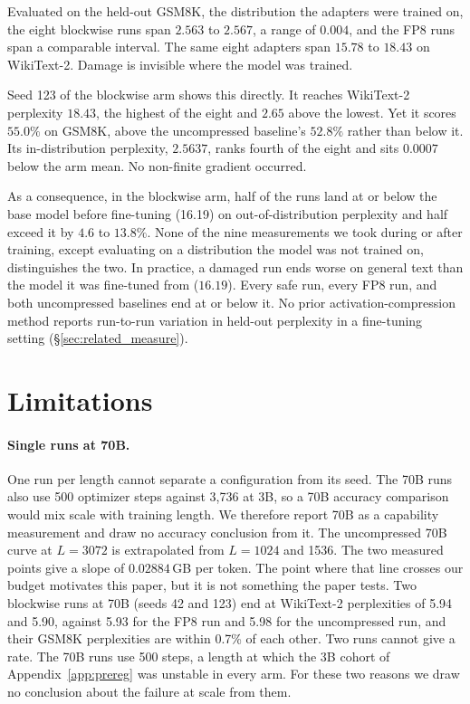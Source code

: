 \documentclass[11pt,letterpaper]{article}
\begin{document}
Evaluated on the held-out GSM8K, the distribution the adapters were trained on, the eight blockwise runs span $2.563$ to $2.567$, a range of $0.004$, and the FP8 runs span a comparable interval. The same eight adapters span $15.78$ to $18.43$ on WikiText-2. Damage is invisible where the model was trained.

Seed 123 of the blockwise arm shows this directly. It reaches WikiText-2 perplexity $18.43$, the highest of the eight and $2.65$ above the lowest. Yet it scores $55.0\%$ on GSM8K, above the uncompressed baseline's $52.8\%$ rather than below it. Its in-distribution perplexity, $2.5637$, ranks fourth of the eight and sits $0.0007$ below the arm mean. No non-finite gradient occurred.


As a consequence, in the blockwise arm, half of the runs land at or below the base model before fine-tuning (16.19) on out-of-distribution perplexity and half exceed it by $4.6$ to $13.8\%$. None of the nine measurements we took during or after training, except evaluating on a distribution the model was not trained on, distinguishes the two. In practice, a damaged run ends worse on general text than the model it was fine-tuned from ($16.19$). Every safe run, every FP8 run, and both uncompressed baselines end at or below it. No prior activation-compression method reports run-to-run variation in held-out perplexity in a fine-tuning setting (\S\ref{sec:related_measure}).


\section{Limitations}
\label{sec:limitations}
\paragraph{Single runs at 70B.} One run per length cannot separate a configuration from its seed. The 70B runs also use 500 optimizer steps against 3{,}736 at 3B, so a 70B accuracy comparison would mix scale with training length. We therefore report 70B as a capability measurement and draw no accuracy conclusion from it. The uncompressed 70B curve at $L{=}3072$ is extrapolated from $L{=}1024$ and 1536. The two measured points give a slope of $0.02884$\,GB per token. The point where that line crosses our budget motivates this paper, but it is not something the paper tests. Two blockwise runs at 70B (seeds 42 and 123) end at WikiText-2 perplexities of 5.94 and 5.90, against 5.93 for the FP8 run and 5.98 for the uncompressed run, and their GSM8K perplexities are within 0.7\% of each other. Two runs cannot give a rate. The 70B runs use 500 steps, a length at which the 3B cohort of Appendix~\ref{app:prereg} was unstable in every arm. For these two reasons we draw no conclusion about the failure at scale from them.
\end{document}
